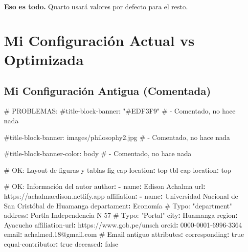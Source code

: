 \documentclass[
  doc,
  floatsintext,
  longtable,
  a4paper,
  nolmodern,
  notxfonts,
  notimes,
  12pt,
  colorlinks=true,linkcolor=blue,citecolor=blue,urlcolor=blue]{apa7}
\newenvironment{Shaded}{\begin{snugshade}}{\end{snugshade}}
\newcommand{\AttributeTok}[1]{\textcolor[rgb]{0.40,0.45,0.13}{#1}}
\newcommand{\CharTok}[1]{\textcolor[rgb]{0.13,0.47,0.30}{#1}}
\newcommand{\CommentTok}[1]{\textcolor[rgb]{0.37,0.37,0.37}{#1}}
\newcommand{\FunctionTok}[1]{\textcolor[rgb]{0.28,0.35,0.67}{#1}}
\newcommand{\KeywordTok}[1]{\textcolor[rgb]{0.00,0.23,0.31}{\textbf{#1}}}
\begin{document}
\textbf{Eso es todo.} Quarto usará valores por defecto para el resto.

\section{Mi Configuración Actual vs
Optimizada}\label{mi-configuraciuxf3n-actual-vs-optimizada}

\subsection{Mi Configuración Antigua
(Comentada)}\label{mi-configuraciuxf3n-antigua-comentada}

\begin{Shaded}
\begin{Highlighting}[]
\CommentTok{\#  PROBLEMAS:}
\CommentTok{\#title{-}block{-}banner: "\#EDF3F9"  }
\CommentTok{\# {-} Comentado, no hace nada}

\CommentTok{\#title{-}block{-}banner: images/philosophy2.jpg }
\CommentTok{\# {-} Comentado, no hace nada}

\CommentTok{\#title{-}block{-}banner{-}color: body  }
\CommentTok{\# {-} Comentado, no hace nada}

\CommentTok{\# OK: Layout de figuras y tablas}
\FunctionTok{fig{-}cap{-}location}\KeywordTok{:}\AttributeTok{ top  }
\FunctionTok{tbl{-}cap{-}location}\KeywordTok{:}\AttributeTok{ top  }

\CommentTok{\# OK: Información del autor}
\FunctionTok{author}\KeywordTok{:}
\AttributeTok{  }\KeywordTok{{-}}\AttributeTok{ }\FunctionTok{name}\KeywordTok{:}\AttributeTok{ Edison Achalma}
\AttributeTok{    }\FunctionTok{url}\KeywordTok{:}\AttributeTok{ https://achalmaedison.netlify.app  }
\AttributeTok{    }\FunctionTok{affiliation}\KeywordTok{:}\AttributeTok{ }
\AttributeTok{        }\KeywordTok{{-}}\AttributeTok{ }\FunctionTok{name}\KeywordTok{:}\AttributeTok{ Universidad Nacional de San Cristóbal de Huamanga}
\AttributeTok{          }\FunctionTok{departament}\KeywordTok{:}\AttributeTok{ Economía}\CommentTok{          \#  Typo: "department"}
\AttributeTok{          }\FunctionTok{address}\KeywordTok{:}\AttributeTok{ Portla Independencia N 57}\CommentTok{  \#  Typo: "Portal"}
\AttributeTok{          }\FunctionTok{city}\KeywordTok{:}\AttributeTok{ Huamanga}
\AttributeTok{          }\FunctionTok{region}\KeywordTok{:}\AttributeTok{ Ayacucho}
\AttributeTok{    }\FunctionTok{affiliation{-}url}\KeywordTok{:}\AttributeTok{ https://www.gob.pe/unsch}
\AttributeTok{    }\FunctionTok{orcid}\KeywordTok{:}\AttributeTok{ 0000{-}0001{-}6996{-}3364  }
\AttributeTok{    }\FunctionTok{email}\KeywordTok{:}\AttributeTok{ achalmed.18@gmail.com}\CommentTok{         \#  Email antiguo}
\AttributeTok{    }\FunctionTok{attributes}\KeywordTok{:}
\AttributeTok{      }\FunctionTok{corresponding}\KeywordTok{:}\AttributeTok{ }\CharTok{true}
\AttributeTok{      }\FunctionTok{equal{-}contributor}\KeywordTok{:}\AttributeTok{ }\CharTok{true}
\AttributeTok{      }\FunctionTok{deceased}\KeywordTok{:}\AttributeTok{ }\CharTok{false}


\end{Highlighting}
\end{Shaded}
\end{document}
